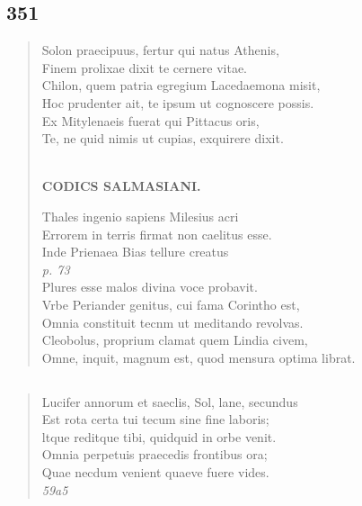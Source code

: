 \documentclass[11pt, a4paper]{report}
\begin{document}
            \subsection*{351}
      \begin{verse}
      Solon praecipuus, fertur qui natus Athenis, \\ Finem prolixae dixit te cernere vitae. \\ Chilon, quem patria egregium Lacedaemona misit, \\ Hoc prudenter ait, te ipsum ut cognoscere possis. \\ Ex Mitylenaeis fuerat qui Pittacus oris, \\ Te, ne quid nimis ut cupias, exquirere dixit. \\ 
        ﻿\pagebreak 
    \begin{center} \textbf{CODICS SALMASIANI.} \end{center}Thales ingenio sapiens Milesius acri \\ Errorem in terris firmat non caelitus esse. \\ Inde Prienaea Bias tellure creatus \\ \textit{p. 73} \\ Plures esse malos divina voce probavit. \\ Vrbe Periander genitus, cui fama Corintho est, \\ Omnia constituit tecnm ut meditando revolvas. \\ Cleobolus, proprium clamat quem Lindia civem, \\ Omne, inquit, magnum est, quod mensura optima librat. \\ 
      \end{verse}
  
            \subsection*{}
      \begin{verse}
      Lucifer annorum et saeclis, Sol, lane, secundus \\ Est rota certa tui tecum sine fine laboris; \\ ltque reditque tibi, quidquid in orbe venit. \\ Omnia perpetuis praecedis frontibus ora; \\ Quae necdum venient quaeve fuere vides. \\ \textit{59a5} \\ 
      \end{verse}
  
\end{document}
